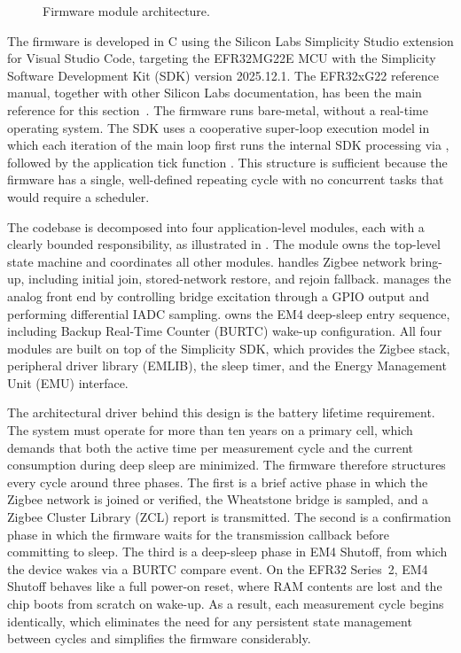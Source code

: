 \begin{figure}[!b]
\centering

    \caption{Firmware module architecture.}
    \label{fig:fw_architecture}
\end{figure}

The firmware is developed in C using the Silicon Labs Simplicity Studio extension for Visual Studio Code, targeting the EFR32MG22E MCU with the Simplicity Software Development Kit (SDK) version 2025.12.1. The EFR32xG22 reference manual, together with other Silicon Labs documentation, has been the main reference for this section~\cite{silabs_efr32xg22_reference, silabs_efr32xg22_wireless, silabs_Zigbee_EmberZNet_PRO,Simplicity_Studio_6_Overview}. The firmware runs bare-metal, without a real-time operating system.
The SDK uses a cooperative super-loop execution model in which each iteration of the main loop first runs the internal SDK processing via , followed by the application tick function .
This structure is sufficient because the firmware has a single, well-defined repeating cycle with no concurrent tasks that would require a scheduler.
 
The codebase is decomposed into four application-level modules, each with a clearly bounded responsibility, as illustrated in .
The module  owns the top-level state machine and coordinates all other modules.
 handles Zigbee network bring-up, including initial join, stored-network restore, and rejoin fallback.
 manages the analog front end by controlling bridge excitation through a GPIO output and performing differential IADC sampling.
 owns the EM4 deep-sleep entry sequence, including Backup Real-Time Counter (BURTC) wake-up configuration.
All four modules are built on top of the Simplicity SDK, which provides the Zigbee stack, peripheral driver library (EMLIB), the sleep timer, and the Energy Management Unit (EMU) interface.

The architectural driver behind this design is the battery lifetime requirement.
The system must operate for more than ten years on a primary cell, which demands that both the active time per measurement cycle and the current consumption during deep sleep are minimized.
The firmware therefore structures every cycle around three phases.
The first is a brief active phase in which the Zigbee network is joined or verified, the Wheatstone bridge is sampled, and a Zigbee Cluster Library (ZCL) report is transmitted.
The second is a confirmation phase in which the firmware waits for the transmission callback before committing to sleep.
The third is a deep-sleep phase in EM4 Shutoff, from which the device wakes via a BURTC compare event.
On the EFR32 Series~2, EM4 Shutoff behaves like a full power-on reset, where RAM contents are lost and the chip boots from scratch on wake-up. As a result, each measurement cycle begins identically, which eliminates the need for any persistent state management between cycles and simplifies the firmware considerably.

